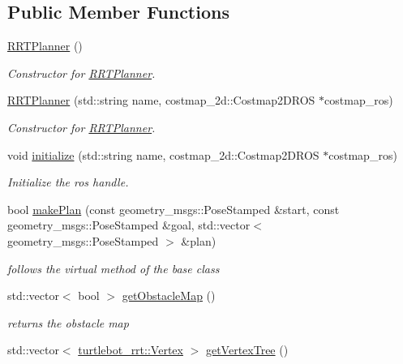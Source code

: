 \subsection*{Public Member Functions}
\begin{DoxyCompactItemize}
\item 
\hyperlink{classturtlebot__rrt_1_1RRTPlanner_a64bd617e0889067fb6a2514b304939f0}{R\+R\+T\+Planner} ()\hypertarget{classturtlebot__rrt_1_1RRTPlanner_a64bd617e0889067fb6a2514b304939f0}{}\label{classturtlebot__rrt_1_1RRTPlanner_a64bd617e0889067fb6a2514b304939f0}

\begin{DoxyCompactList}\small\item\em Constructor for \hyperlink{classturtlebot__rrt_1_1RRTPlanner}{R\+R\+T\+Planner}. \end{DoxyCompactList}\item 
\hyperlink{classturtlebot__rrt_1_1RRTPlanner_ab6a87e2501b5b750f7c5e6b93bb8fa0a}{R\+R\+T\+Planner} (std\+::string name, costmap\+\_\+2d\+::\+Costmap2\+D\+R\+OS $\ast$costmap\+\_\+ros)
\begin{DoxyCompactList}\small\item\em Constructor for \hyperlink{classturtlebot__rrt_1_1RRTPlanner}{R\+R\+T\+Planner}. \end{DoxyCompactList}\item 
void \hyperlink{classturtlebot__rrt_1_1RRTPlanner_a55b8df1e76bd8daf5411bbaaea058102}{initialize} (std\+::string name, costmap\+\_\+2d\+::\+Costmap2\+D\+R\+OS $\ast$costmap\+\_\+ros)
\begin{DoxyCompactList}\small\item\em Initialize the ros handle. \end{DoxyCompactList}\item 
bool \hyperlink{classturtlebot__rrt_1_1RRTPlanner_a923e270ae622186b06cfbb44fc1b50b0}{make\+Plan} (const geometry\+\_\+msgs\+::\+Pose\+Stamped \&start, const geometry\+\_\+msgs\+::\+Pose\+Stamped \&goal, std\+::vector$<$ geometry\+\_\+msgs\+::\+Pose\+Stamped $>$ \&plan)
\begin{DoxyCompactList}\small\item\em follows the virtual method of the base class \end{DoxyCompactList}\item 
std\+::vector$<$ bool $>$ \hyperlink{classturtlebot__rrt_1_1RRTPlanner_a37827fa1a390fc0014deb4cd487e8079}{get\+Obstacle\+Map} ()
\begin{DoxyCompactList}\small\item\em returns the obstacle map \end{DoxyCompactList}\item 
std\+::vector$<$ \hyperlink{classturtlebot__rrt_1_1Vertex}{turtlebot\+\_\+rrt\+::\+Vertex} $>$ \hyperlink{classturtlebot__rrt_1_1RRTPlanner_a7fa3dc4af8671dea1261f91d995442d9}{get\+Vertex\+Tree} ()\hypertarget{classturtlebot__rrt_1_1RRTPlanner_a7fa3dc4af8671dea1261f91d995442d9}{}\label{classturtlebot__rrt_1_1RRTPlanner_a7fa3dc4af8671dea1261f91d995442d9}


\end{DoxyCompactItemize}
